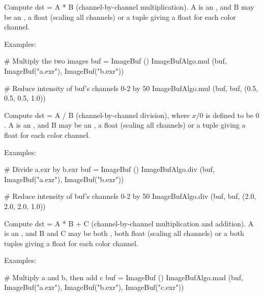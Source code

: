  

Compute {\cf dst} = {\cf A * B} (channel-by-channel multiplication).  {\cf A}
is an \ImageBuf, and {\cf B}  may be an \ImageBuf, a {\cf float} (scaling
all channels) or a tuple giving a {\cf float} for each color channel.

\smallskip
\noindent Examples:
\begin{code}
    # Multiply the two images
    buf = ImageBuf ()
    ImageBufAlgo.mul (buf, ImageBuf("a.exr"), ImageBuf("b.exr"))

    # Reduce intensity of buf's channels 0-2 by 50%
    ImageBufAlgo.mul (buf, buf, (0.5, 0.5, 0.5, 1.0))
\end{code}
\apiend


 

Compute {\cf dst} = {\cf A / B} (channel-by-channel division), where $x/0$
is defined to be $0$.  {\cf A} is an \ImageBuf, and {\cf B}  may be an
\ImageBuf, a {\cf float} (scaling all channels) or a tuple giving a {\cf
float} for each color channel.

\smallskip
\noindent Examples:
\begin{code}
    # Divide a.exr by b.exr
    buf = ImageBuf ()
    ImageBufAlgo.div (buf, ImageBuf("a.exr"), ImageBuf("b.exr"))

    # Reduce intensity of buf's channels 0-2 by 50%
    ImageBufAlgo.div (buf, buf, (2.0, 2.0, 2.0, 1.0))
\end{code}
\apiend


 

Compute {\cf dst} = {\cf A * B + C} (channel-by-channel multiplication
and addition). {\cf A}
is an \ImageBuf, and {\cf B} and {\cf C} may be both \ImageBuf, both
{\cf float} (scaling all channels) or a both tuples giving a {\cf float} for
each color channel.

\smallskip
\noindent Examples:
\begin{code}
    # Multiply a and b, then add c
    buf = ImageBuf ()
    ImageBufAlgo.mad (buf, ImageBuf("a.exr"),
                      ImageBuf("b.exr"), ImageBuf("c.exr"))
\end{code}
\apiend



